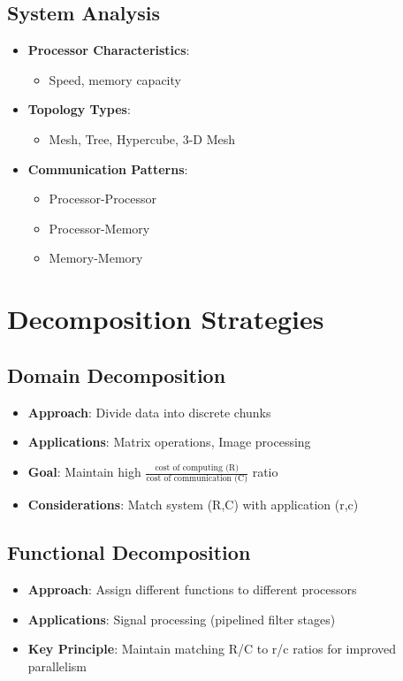 \documentclass[12pt]{article}
\begin{document}
\subsection{System Analysis}
\begin{itemize}
  \item \textbf{Processor Characteristics}:
        \begin{itemize}
          \item Speed, memory capacity
        \end{itemize}

  \item \textbf{Topology Types}:
        \begin{itemize}
          \item Mesh, Tree, Hypercube, 3-D Mesh
        \end{itemize}

  \item \textbf{Communication Patterns}:
        \begin{itemize}
          \item Processor-Processor
          \item Processor-Memory
          \item Memory-Memory
        \end{itemize}
\end{itemize}

\section{Decomposition Strategies}

\subsection{Domain Decomposition}
\begin{itemize}
  \item \textbf{Approach}: Divide data into discrete chunks
  \item \textbf{Applications}: Matrix operations, Image processing
  \item \textbf{Goal}: Maintain high $\frac{\text{cost of computing (R)}}{\text{cost of communication (C)}}$ ratio
  \item \textbf{Considerations}: Match system (R,C) with application (r,c)
\end{itemize}

\subsection{Functional Decomposition}
\begin{itemize}
  \item \textbf{Approach}: Assign different functions to different processors
  \item \textbf{Applications}: Signal processing (pipelined filter stages)
  \item \textbf{Key Principle}: Maintain matching R/C to r/c ratios for improved parallelism
\end{itemize}
\end{document}
